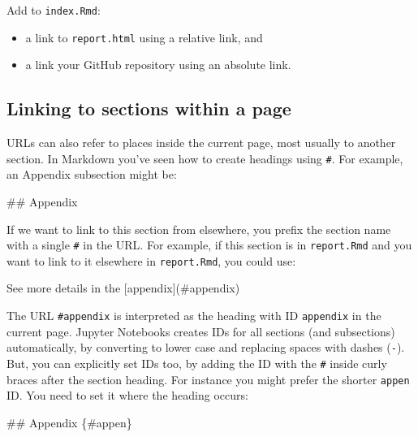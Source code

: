 \documentclass[]{Nemilov}
\newenvironment{Shaded}{\begin{snugshade}}{\end{snugshade}}
\newcommand{\FunctionTok}[1]{\textcolor[rgb]{0.00,0.00,0.00}{#1}}
\newcommand{\NormalTok}[1]{#1}
\newcommand{\OtherTok}[1]{\textcolor[rgb]{0.56,0.35,0.01}{#1}}
\providecommand{\tightlist}{%
  \setlength{\itemsep}{0pt}\setlength{\parskip}{0pt}}
\begin{document}
Add to \texttt{index.Rmd}:

\begin{itemize}
\tightlist
\item
  a link to \texttt{report.html} using a relative link, and
\item
  a link your GitHub repository using an absolute link.
\end{itemize}

\hypertarget{linking-to-sections-within-a-page}{%
\subsection{Linking to sections within a page}\label{linking-to-sections-within-a-page}}

URLs can also refer to places inside the current page,
most usually to another section.
In Markdown you've seen how to create headings using \texttt{\#}.
For example,
an Appendix subsection might be:

\begin{Shaded}
\begin{Highlighting}[]
\FunctionTok{## Appendix}
\end{Highlighting}
\end{Shaded}

If we want to link to this section from elsewhere,
you prefix the section name with a single \texttt{\#} in the URL.
For example,
if this section is in \texttt{report.Rmd} and you want to link to it elsewhere in \texttt{report.Rmd},
you could use:

\begin{Shaded}
\begin{Highlighting}[]
\NormalTok{See more details in the }\OtherTok{[appendix](#appendix)}
\end{Highlighting}
\end{Shaded}

The URL \texttt{\#appendix} is interpreted as the heading with ID \texttt{appendix} in the current page.
Jupyter Notebooks creates IDs for all sections (and subsections) automatically,
by converting to lower case and replacing spaces with dashes (\texttt{-}).
But,
you can explicitly set IDs too,
by adding the ID with the \texttt{\#} inside curly braces after the section heading.
For instance you might prefer the shorter \texttt{appen} ID.
You need to set it where the heading occurs:

\begin{Shaded}
\begin{Highlighting}[]
\FunctionTok{## Appendix \{#appen\}}
\end{Highlighting}
\end{Shaded}
\end{document}
